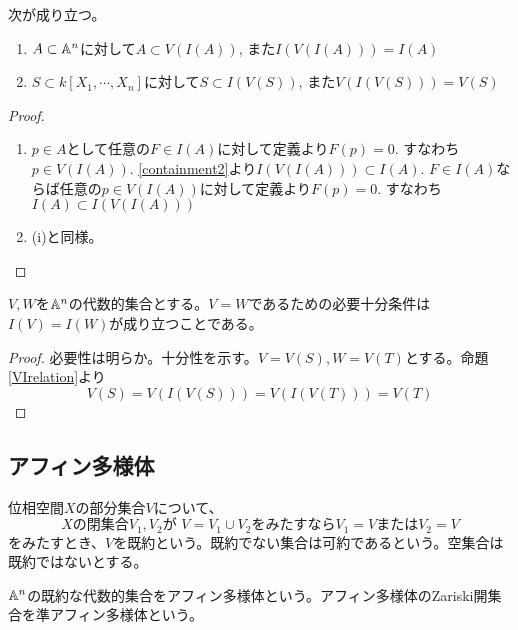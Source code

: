 \documentclass{ltjsreport}
\begin{document}
\begin{prop}\label{VIrelation}
  次が成り立つ。
  \begin{enumerate}
    \item $A\subset \mathbb{A}^n$に対して$A\subset V(I(A))$, また$I(V(I(A)))=I(A)$
    \item $S\subset k[X_1,\cdots,X_n]$に対して$S\subset I(V(S))$, また$V(I(V(S)))=V(S)$
  \end{enumerate}
\end{prop}

\begin{proof}
  \begin{enumerate}
    \item $p\in A$として任意の$F\in I(A)$に対して定義より$F(p)=0$. すなわち$p\in V(I(A))$. \ref{containment2}より$I(V(I(A)))\subset I(A)$. $F\in I(A)$ならば任意の$p\in V(I(A))$に対して定義より$F(p)=0$. すなわち$I(A)\subset I(V(I(A)))$
    \item (i)と同様。
  \end{enumerate}
\end{proof}

\begin{prop}
  $V,W$を$\mathbb{A}^n$の代数的集合とする。$V=W$であるための必要十分条件は$I(V)=I(W)$が成り立つことである。
\end{prop}

\begin{proof}
  必要性は明らか。十分性を示す。$V=V(S), W=V(T)$とする。命題\ref{VIrelation}より
  \[
  V(S)=V(I(V(S)))=V(I(V(T)))=V(T)
  \]
\end{proof}





\subsection{アフィン多様体}

\begin{defin}
  位相空間$X$の部分集合$V$について、
  \[
  \text{$X$の閉集合$V_1,V_2$が }V=V_1\cup V_2\text{をみたすなら$V_1=V$または$V_2=V$}  
  \]
  をみたすとき、$V$を既約という。既約でない集合は可約であるという。空集合は既約ではないとする。
\end{defin}

\begin{defin}
  $\mathbb{A}^n$の既約な代数的集合をアフィン多様体という。アフィン多様体のZariski開集合を準アフィン多様体という。
\end{defin}
\end{document}
